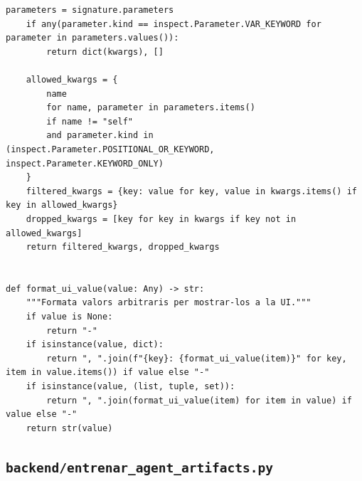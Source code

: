 \documentclass[10pt,a4paper]{article}
\begin{document}
\begin{lstlisting}[style=studioPython,caption={backend/common.py},label={lst:backend-common-py}]
    parameters = signature.parameters
    if any(parameter.kind == inspect.Parameter.VAR_KEYWORD for parameter in parameters.values()):
        return dict(kwargs), []

    allowed_kwargs = {
        name
        for name, parameter in parameters.items()
        if name != "self"
        and parameter.kind in (inspect.Parameter.POSITIONAL_OR_KEYWORD, inspect.Parameter.KEYWORD_ONLY)
    }
    filtered_kwargs = {key: value for key, value in kwargs.items() if key in allowed_kwargs}
    dropped_kwargs = [key for key in kwargs if key not in allowed_kwargs]
    return filtered_kwargs, dropped_kwargs


def format_ui_value(value: Any) -> str:
    """Formata valors arbitraris per mostrar-los a la UI."""
    if value is None:
        return "-"
    if isinstance(value, dict):
        return ", ".join(f"{key}: {format_ui_value(item)}" for key, item in value.items()) if value else "-"
    if isinstance(value, (list, tuple, set)):
        return ", ".join(format_ui_value(item) for item in value) if value else "-"
    return str(value)
\end{lstlisting}


\subsection{\texorpdfstring{\texttt{backend/entrenar\_agent\_artifacts.py}}{backend/entrenar\_agent\_artifacts.py}}
\end{document}

